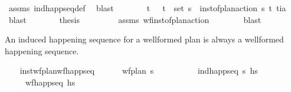 \begin{isabellebody}
\ assms\ ind{\isacharunderscore}{\kern0pt}happ{\isacharunderscore}{\kern0pt}seq{\isacharunderscore}{\kern0pt}def\ \isamarkupfalse%
\ blast\isanewline
\ \ \ \ \isamarkupfalse%
\ \isamarkupfalse%
\ t\isactrlsub {\isasympi}\ {\isasympi}\ \ {\isachardoublequoteopen}{\isacharparenleft}{\kern0pt}t\isactrlsub {\isasympi}{\isacharcomma}{\kern0pt}{\isasympi}{\isacharparenright}{\kern0pt}\ {\isasymin}\ set\ {\isasympi}s{\isachardoublequoteclose}\ \ {\isachardoublequoteopen}inst{\isacharunderscore}{\kern0pt}of{\isacharunderscore}{\kern0pt}plan{\isacharunderscore}{\kern0pt}action\ {\isasympi}s\ {\isacharparenleft}{\kern0pt}t\isactrlsub {\isasympi}{\isacharcomma}{\kern0pt}{\isasympi}{\isacharparenright}{\kern0pt}\ {\isacharparenleft}{\kern0pt}t\isactrlsub i{\isacharcomma}{\kern0pt}a{\isacharparenright}{\kern0pt}{\isachardoublequoteclose}\ \isamarkupfalse%
\ blast\isanewline
\ \ \ \ \isamarkupfalse%
\ \isamarkupfalse%
\ {\isacharquery}{\kern0pt}thesis\ \isanewline
\ \ \ \ \ \ \isamarkupfalse%
\ assms\ wf{\isacharunderscore}{\kern0pt}inst{\isacharunderscore}{\kern0pt}of{\isacharunderscore}{\kern0pt}plan{\isacharunderscore}{\kern0pt}action\isanewline
\ \ \ \ \ \ \isamarkupfalse%
\ blast\isanewline
\ \ \isamarkupfalse%
%
\endisatagproof
{\isafoldproof}%
%
\isadelimproof
%
\endisadelimproof
%
\begin{isamarkuptext}%
An induced happening sequence for a wellformed plan is always a wellformed 
  happening sequence.%
\end{isamarkuptext}\isamarkuptrue%
\ \ \isamarkupfalse%
\ inst{\isacharunderscore}{\kern0pt}wf{\isacharunderscore}{\kern0pt}plan{\isacharunderscore}{\kern0pt}wf{\isacharunderscore}{\kern0pt}happ{\isacharunderscore}{\kern0pt}seq{\isacharcolon}{\kern0pt}\ \isanewline
\ \ \ \ \ {\isachardoublequoteopen}wf{\isacharunderscore}{\kern0pt}plan\ {\isasympi}s{\isachardoublequoteclose}\ \isanewline
\ \ \ \ \ \ \ \ \ {\isachardoublequoteopen}ind{\isacharunderscore}{\kern0pt}happ{\isacharunderscore}{\kern0pt}seq\ {\isasympi}s\ hs{\isachardoublequoteclose}\isanewline
\ \ \ \ \ {\isachardoublequoteopen}wf{\isacharunderscore}{\kern0pt}happ{\isacharunderscore}{\kern0pt}seq\ hs{\isachardoublequoteclose}\isanewline
%
\isadelimproof
\ \ \ \ %
\endisadelimproof
%
\isatagproof
{}\isamarkupfalse%

\end{isabellebody}
